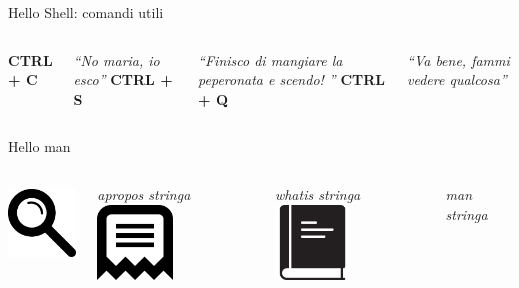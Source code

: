 \documentclass{beamer}
\begin{document}
    \begin{frame}{Hello Shell: comandi utili}
        \begin{columns}[t, onlytextwidth]
                \centering
                \Huge \textbf{CTRL + C}
                
                \vspace{0.2cm}
                
                \normalsize \textit{``No maria, io esco''}
                \centering
                \Huge \textbf{CTRL + S}

                \vspace{0.2cm}

                \normalsize \textit{``Finisco di mangiare la peperonata e scendo! ''}
                \centering
                \Huge \textbf{CTRL + Q}

                \vspace{0.2cm}

                \normalsize \textit{``Va bene, fammi vedere qualcosa''}
        \end{columns}
    \end{frame}

    \begin{frame}{Hello man}
        \begin{columns}[t, onlytextwidth]
                \centering
                \includegraphics[height=2cm]{images/search.pdf}

                \vspace{0.2cm}

                \textit{apropos stringa}
                \centering
                \includegraphics[height=2cm]{images/whatis.pdf}

                \vspace{0.2cm}

                \textit{whatis stringa}
                \centering
                \includegraphics[height=2cm]{images/man.pdf}

                \vspace{0.2cm}
                
                \textit{man stringa}
        \end{columns}
    \end{frame}
\end{document}
